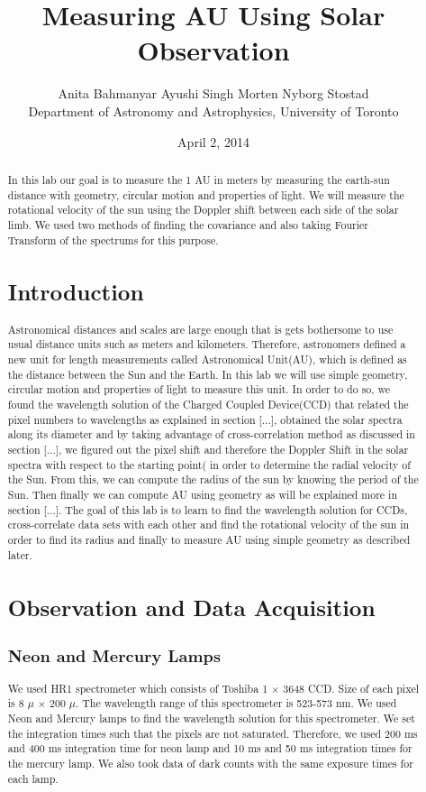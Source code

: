 \documentclass[letterpaper,12pt]{article}
\title{Measuring AU Using Solar Observation}
\author{Anita Bahmanyar \qquad Ayushi Singh \qquad Morten Nyborg Stostad \\Department of Astronomy and Astrophysics, University of Toronto}
\affil{\small {Written by: Anita Bahmanyar}}
\affil{\small {anita.bahmanyar@mail.utoronto.ca}}
\affil{\small {Student Number: 998909098}}
\date{April 2, 2014}
\begin{document}
\maketitle

\begin{abstract}
\label{abstract}
In this lab our goal is to measure the 1 AU in meters by measuring the earth-sun distance with geometry, circular motion and properties of light. We will measure the rotational velocity of the sun using the Doppler shift between each side of the solar limb. We used two methods of finding the covariance and also taking Fourier Transform of the spectrums for this purpose.



\section{Introduction}
\label{sec:introduction}
Astronomical distances and scales are large enough that is gets bothersome to use usual distance units such as meters and kilometers. Therefore, astronomers defined a new unit for length measurements called Astronomical Unit(AU), which is defined as the distance between the Sun and the Earth. In this lab we will use simple geometry, circular motion and properties of light to measure this unit. In order to do so, we found the wavelength solution of the Charged Coupled Device(CCD) that related the pixel numbers to wavelengths as explained in section [...], obtained the solar spectra along its diameter and by taking advantage of cross-correlation method as discussed in section [...], we figured out the pixel shift and therefore the Doppler Shift in the solar spectra with respect to the starting point( in order to determine the radial velocity of the Sun. From this, we can compute the radius of the sun by knowing the period of the Sun. Then finally we can compute AU using geometry as will be explained more in section [...]. The goal of this lab is to learn to find the wavelength solution for CCDs, cross-correlate data sets with each other and find the rotational velocity of the sun in order to find its radius and finally to measure AU using simple geometry as described later.


 
\section{Observation and Data Acquisition}
\label{sec:observationanddataacquisition}
\subsection{Neon and Mercury Lamps}
We used HR1 spectrometer which consists of Toshiba 1 $\times$ 3648 CCD. Size of each pixel is 8 $\mu$ $\times$ 200 $\mu$.  The wavelength range of this spectrometer is 523-573 nm. We used Neon and Mercury lamps to find the wavelength solution for this spectrometer. We set the integration times such that the pixels are not saturated. Therefore, we used 200 ms and 400 ms integration time for neon lamp and 10 ms and 50 ms integration times for the mercury lamp. We also took data of dark counts with the same exposure times for each lamp. 

\end{abstract}
\end{document}
